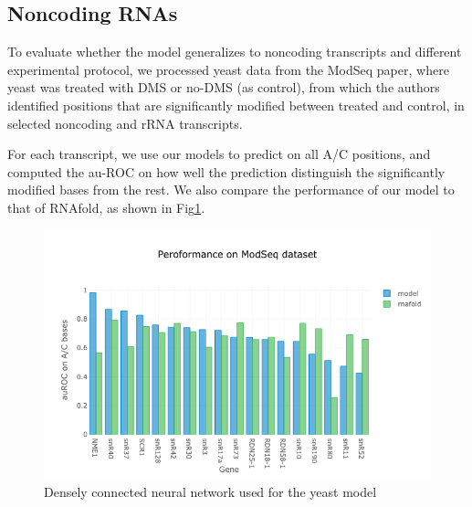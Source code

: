 \documentclass{proposal}
\begin{document}
\subsection{Noncoding RNAs}

To evaluate whether the model generalizes to noncoding transcripts and different experimental protocol,
we processed yeast data from the ModSeq paper\cite{talkish2014mod},
where yeast was treated with DMS or no-DMS (as control),
from which the authors identified positions that are significantly modified between treated and control,
in selected noncoding and rRNA transcripts.

For each transcript, we use our models to predict on all A/C positions,
and computed the au-ROC on how well the prediction distinguish the significantly modified bases from the rest.
We also compare the performance of our model to that of RNAfold, as shown in Fig\ref{fig:yeast_modseq_performance}.

\begin{figure}[h!]
\includegraphics[width=\textwidth]{yeast_modseq_performance.png}
\caption{Densely connected neural network used for the yeast model}
\label{fig:yeast_modseq_performance}
\centering
\end{figure}


%
%



%
%




\end{document}
